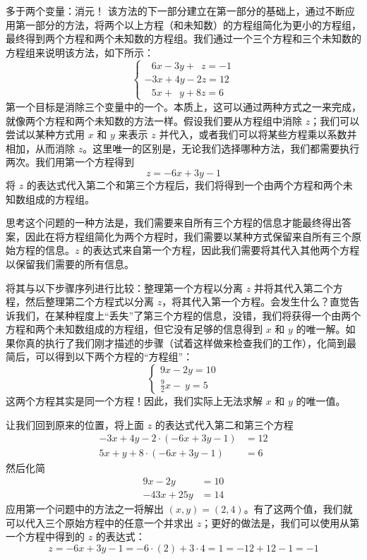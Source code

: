 \begin{method}{多于两个变量：消元！}
    该方法的下一部分建立在第一部分的基础上，通过不断应用第一部分的方法，将两个以上方程（和未知数）的方程组简化为更小的方程组，最终得到两个方程和两个未知数的方程组。我们通过一个三个方程和三个未知数的方程组来说明该方法，如下所示：
    $$
    \begin{cases}
        \enspace\: 6x - 3y + \enspace z = -1 \\
        -3x + 4y - 2z = 12 \\
        \enspace\: 5x + \enspace y + 8z = 6
    \end{cases}
    $$
    第一个目标是消除三个变量中的一个。本质上，这可以通过两种方式之一来完成，就像两个方程和两个未知数的方法一样。假设我们要从方程组中消除 $z$；我们可以尝试以某种方式用 $x$ 和 $y$ 来表示 $z$ 并代入，或者我们可以将某些方程乘以系数并相加，从而消除 $z$。这里唯一的区别是，无论我们选择哪种方法，我们都需要执行两次。我们用第一个方程得到
    \[z = -6x + 3y - 1\]
    将 $z$ 的表达式代入第二个和第三个方程后，我们将得到一个由两个方程和两个未知数组成的方程组。

    思考这个问题的一种方法是，我们需要来自所有三个方程的信息才能最终得出答案，因此在将方程组简化为两个方程时，我们需要以某种方式保留来自所有三个原始方程的信息。$z$ 的表达式来自第一个方程，因此我们需要将其代入其他两个方程以保留我们需要的所有信息。

    将其与以下步骤序列进行比较：整理第一个方程以分离 $z$ 并将其代入第二个方程，然后整理第二个方程式以分离 $z$，将其代入第一个方程。会发生什么？直觉告诉我们，在某种程度上``丢失''了第三个方程的信息，没错，我们将获得一个由两个方程和两个未知数组成的方程组，但它没有足够的信息得到 $x$ 和 $y$ 的唯一解。如果你真的执行了我们刚才描述的步骤（试着这样做来检查我们的工作），化简到最简后，可以得到以下两个方程的``方程组''：
    $$
    \begin{cases}
        9x - 2y = 10 \\
        \frac{9}{2}x - \:y = 5
    \end{cases}
    $$
    这两个方程其实是同一个方程！因此，我们实际上无法求解 $x$ 和 $y$ 的唯一值。

    让我们回到原来的位置，将上面 $z$ 的表达式代入第二和第三个方程
    \begin{align*}
        -3x + 4y - 2 \cdot (-6x + 3y - 1) &= 12 \\
        5x + y + 8 \cdot (-6x + 3y - 1) &= 6
    \end{align*}
    然后化简
    \begin{align*}
        9x - 2y &= 10 \\
        -43x + 25y &= 14
    \end{align*}
    应用第一个问题中的方法之一将解出 $(x, y) = (2, 4)$。有了这两个值，我们就可以代入三个原始方程中的任意一个并求出 $z$；更好的做法是，我们可以使用从第一个方程中得到的 $z$ 的表达式：
    \[z = -6x + 3y - 1 = -6 \cdot (2) + 3 \cdot 4 = 1 = -12 + 12 - 1 = -1\]
\end{method}

